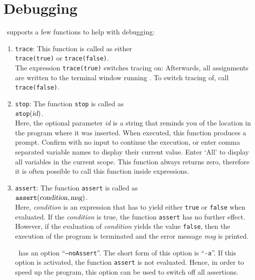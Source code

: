 \section{Debugging}
\setlx\ supports a few functions to help with debugging:
\begin{enumerate}
\item \texttt{trace}:  This function is called as either
      \\[0.2cm]
      \hspace*{1.3cm}
      \texttt{trace(true)} \quad or \quad \texttt{trace(false)}.
      \\[0.2cm]
      The expression \texttt{trace(true)} switches tracing on:  Afterwards, all
      assignments are written to the terminal window running \setlx.  To switch tracing
      of, call \texttt{trace(false)}.
\item \texttt{stop}:  The function \texttt{stop}  is called as
      \\[0.2cm]
      \hspace*{1.3cm}
      $\texttt{stop}(\textsl{id})$.
      \\[0.2cm]
      Here, the optional parameter \textsl{id} is a string that reminds you
      of the location in the program where it was inserted. When executed, this function produces a
      prompt.  Confirm with no input to continue the execution, or enter comma separated variable
      names to display their current value. Enter `All' to display all variables in the current scope.
      This function always returns zero, therefore it is often possible to call this function inside expressions.
\item \texttt{assert}: The function \texttt{assert}  is called as
      \\[0.2cm]
      \hspace*{1.3cm}
      $\texttt{assert}(\textsl{condition}, \textsl{msg})$.
      \\[0.2cm]
      Here, \textsl{condition} is an expression that has to  yield either \texttt{true} or \texttt{false}
      when evaluated. If the \textsl{condition} is true, the function \texttt{assert} has no
      further effect.  However, if the evaluation of \textsl{condition} yields the value
      \texttt{false}, then the execution of the program is terminated and the error message
      \textsl{msg} is printed.

      \setlx\ has an option ``\texttt{--noAssert}''.  The short form of this option is ``\texttt{-a}''.
      If this option is activated, the function \texttt{assert} is not evaluated.  Hence,  in order
      to speed up the program, this option can be used to switch off all assertions.      
\end{enumerate}


